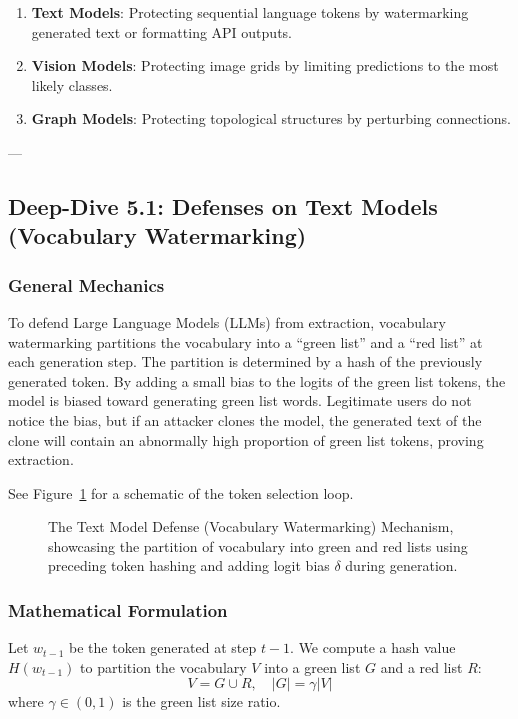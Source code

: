 \documentclass{article}
\begin{document}
\begin{enumerate}
    \item \textbf{Text Models}: Protecting sequential language tokens by watermarking generated text or formatting API outputs.
    \item \textbf{Vision Models}: Protecting image grids by limiting predictions to the most likely classes.
    \item \textbf{Graph Models}: Protecting topological structures by perturbing connections.
\end{enumerate}

---

\subsection{Deep-Dive 5.1: Defenses on Text Models (Vocabulary Watermarking)}

\subsubsection{General Mechanics}
To defend Large Language Models (LLMs) from extraction, vocabulary watermarking partitions the vocabulary into a ``green list'' and a ``red list'' at each generation step. The partition is determined by a hash of the previously generated token. By adding a small bias to the logits of the green list tokens, the model is biased toward generating green list words. Legitimate users do not notice the bias, but if an attacker clones the model, the generated text of the clone will contain an abnormally high proportion of green list tokens, proving extraction.

See Figure~\ref{fig:defense_text_models} for a schematic of the token selection loop.

\begin{figure}[htbp]
    \centering
    \caption{The Text Model Defense (Vocabulary Watermarking) Mechanism, showcasing the partition of vocabulary into green and red lists using preceding token hashing and adding logit bias $\delta$ during generation.}
    \label{fig:defense_text_models}
\end{figure}

\subsubsection{Mathematical Formulation}
Let $w_{t-1}$ be the token generated at step $t-1$. We compute a hash value $H(w_{t-1})$ to partition the vocabulary $V$ into a green list $G$ and a red list $R$:
\begin{equation}
    V = G \cup R, \quad |G| = \gamma |V|
\end{equation}
where $\gamma \in (0, 1)$ is the green list size ratio.
\end{document}
